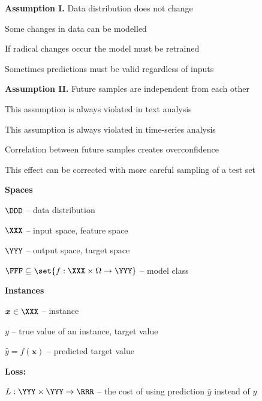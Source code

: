 \documentclass[landscape,footrule]{foils}
\renewcommand{\vec}[1]{\boldsymbol{#1}}
\begin{document}

\textbf{Assumption I.} Data distribution does not change
\begin{triangles}
\item Some changes in data can be modelled
\item If radical changes occur the model must be retrained
\item Sometimes predictions must be valid regardless of inputs  \vspace*{1cm}
\end{triangles}

\textbf{Assumption II.} Future samples are independent from each other
\begin{triangles}
\item This assumption is always violated in text analysis
\item This assumption is always violated in time-series analysis
\item Correlation between future samples creates overconfidence
\item This effect can be corrected with more careful sampling of a test set
\end{triangles}


\textbf{Spaces}
\begin{triangles}
\item $\DDD$ -- data distribution
\item $\XXX$ -- input space, feature space
\item $\YYY$ -- output space, target space
\item $\FFF\subseteq\set{f:\XXX\times\Omega\to\YYY}$ -- model class\vspace*{0.5cm}
\end{triangles}

\textbf{Instances}
\begin{triangles}
\item $\vec{x}\in\XXX$ -- instance
\item $y$ -- true value of an instance, target value
\item $\hat{y}=f(\vec{x})$ -- predicted target value\vspace*{0.5cm}
\end{triangles}

\textbf{Loss:}
\begin{triangles}
\item $L:\YYY\times\YYY\to\RRR$ --  the cost of using prediction $\hat{y}$ instead of $y$
\end{triangles}
 
\end{document}
